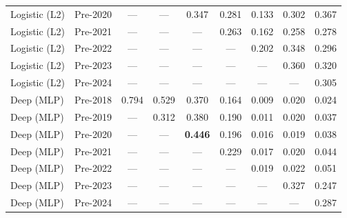\begin{table}[htbp]
{\begin{tabular}{l lccccccc}
Logistic (L2) & Pre-2020 & --- & --- & 0.347 & 0.281 & 0.133 & 0.302 & 0.367 \\
Logistic (L2) & Pre-2021 & --- & --- & --- & 0.263 & 0.162 & 0.258 & 0.278 \\
Logistic (L2) & Pre-2022 & --- & --- & --- & --- & 0.202 & 0.348 & 0.296 \\
Logistic (L2) & Pre-2023 & --- & --- & --- & --- & --- & 0.360 & 0.320 \\
Logistic (L2) & Pre-2024 & --- & --- & --- & --- & --- & --- & 0.305 \\
Deep (MLP) & Pre-2018 & 0.794 & 0.529 & 0.370 & 0.164 & 0.009 & 0.020 & 0.024 \\
Deep (MLP) & Pre-2019 & --- & 0.312 & 0.380 & 0.190 & 0.011 & 0.020 & 0.037 \\
Deep (MLP) & Pre-2020 & --- & --- & \textbf{0.446} & 0.196 & 0.016 & 0.019 & 0.038 \\
Deep (MLP) & Pre-2021 & --- & --- & --- & 0.229 & 0.017 & 0.020 & 0.044 \\
Deep (MLP) & Pre-2022 & --- & --- & --- & --- & 0.019 & 0.022 & 0.051 \\
Deep (MLP) & Pre-2023 & --- & --- & --- & --- & --- & 0.327 & 0.247 \\
Deep (MLP) & Pre-2024 & --- & --- & --- & --- & --- & --- & 0.287 \\
\bottomrule
\end{tabular}%
}
\end{table}